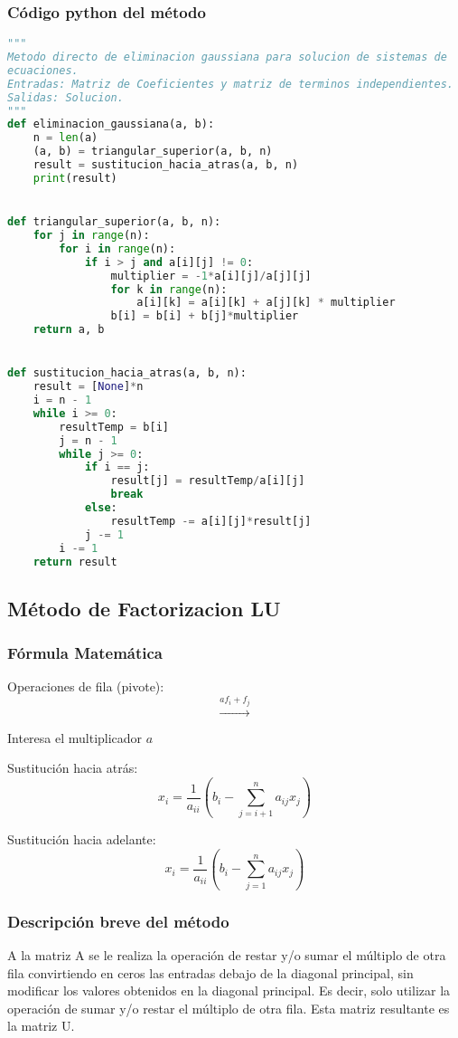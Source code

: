 \documentclass[12pt]{article}
\begin{document}
\subsubsection{Código python del método}
\begin{lstlisting}[language=Python, caption=Implementación del método de Eliminación Gaussiana en Python] 
"""
Metodo directo de eliminacion gaussiana para solucion de sistemas de 
ecuaciones.
Entradas: Matriz de Coeficientes y matriz de terminos independientes.
Salidas: Solucion.
"""
def eliminacion_gaussiana(a, b):
    n = len(a)
    (a, b) = triangular_superior(a, b, n)
    result = sustitucion_hacia_atras(a, b, n)
    print(result)


def triangular_superior(a, b, n):
    for j in range(n):
        for i in range(n):
            if i > j and a[i][j] != 0:
                multiplier = -1*a[i][j]/a[j][j]
                for k in range(n):
                    a[i][k] = a[i][k] + a[j][k] * multiplier
                b[i] = b[i] + b[j]*multiplier
    return a, b


def sustitucion_hacia_atras(a, b, n):
    result = [None]*n
    i = n - 1
    while i >= 0:
        resultTemp = b[i]
        j = n - 1
        while j >= 0:
            if i == j:
                result[j] = resultTemp/a[i][j]
                break
            else:
                resultTemp -= a[i][j]*result[j]
            j -= 1
        i -= 1
    return result


\end{lstlisting}

\subsection{Método de Factorizacion LU}
\subsubsection{Fórmula Matemática}
Operaciones de fila (pivote):
    \[\xrightarrow{af_i + f_j}\]

Interesa el multiplicador \(a\)

Sustitución hacia atrás:
\vspace{1mm}
\[
       x_i = \frac{1}{a_{ii}}(b_i-\sum_{j=i+1}^{n}a_{ij}x_{j})
\]

Sustitución hacia adelante:
\vspace{1mm}
\[
       x_i = \frac{1}{a_{ii}}(b_i-\sum_{j=1}^{n}a_{ij}x_{j})
\]

\subsubsection{Descripción breve del método}
A la matriz A se le realiza la operación de restar y/o sumar el múltiplo
de otra fila convirtiendo en ceros las entradas debajo de la diagonal
principal, sin modificar los valores obtenidos en la diagonal
principal. Es decir, solo utilizar la operación de sumar y/o restar
el múltiplo de otra fila. Esta matriz resultante es la matriz U.
\end{document}
